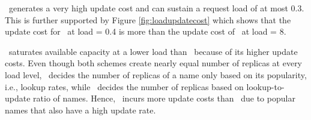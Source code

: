{\replicateall\ generates a very high update cost and can sustain a request load of at most 0.3. This is further supported by  Figure \ref{fig:loadupdatecost} which shows that the update cost for \replicateall\ at load = 0.4 is more than the update cost of \auspice\  at load = 8.

\codons\  saturates available capacity at a lower load than \auspice\ because of its higher update costs.  
Even though both schemes create nearly equal number of replicas at every load level, \codons\ decides the number of replicas of a name only based on its popularity, i.e., lookup rates, while \auspice\ decides the number of replicas based on lookup-to-update ratio of names. Hence, \codons\  incurs more update costs than \auspice\  due to popular names that also have a high update rate.

}



 






%


